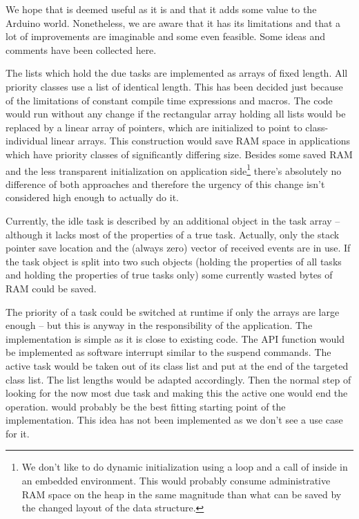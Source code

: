 We hope that \rtos{} is deemed useful as it is and that it adds some value
to the Arduino world. Nonetheless, we are aware that it has its limitations
and that a lot of improvements are imaginable and some even feasible. Some
ideas and comments have been collected here.

The lists which hold the due tasks are implemented as arrays of fixed
length. All priority classes use a list of identical length. This has been
decided just because of the limitations of constant compile time
expressions and macros. The code would run without any change if the
rectangular array holding all lists would be replaced by a linear array of
pointers, which are initialized to point to class-individual linear
arrays. This construction would save RAM space in applications which have
priority classes of significantly differing size. Besides some saved RAM
and the less transparent initialization on application side\footnote{We
don't like to do dynamic initialization using a loop and a call of
 inside in an embedded environment. This would probably
consume administrative RAM space on the heap in the same magnitude than
what can be saved by the changed layout of the \rtos{} data structure.}
there's absolutely no difference of both approaches and therefore the
urgency of this change isn't considered high enough to actually do it.

Currently, the idle task is described by an additional object in the task
array -- although it lacks most of the properties of a true task.
Actually, only the stack pointer save location and the (always zero)
vector of received events are in use. If the task object is split into two
such objects (holding the properties of all tasks and holding the
properties of true tasks only) some currently wasted bytes of RAM could be
saved.

The priority of a task could be switched at runtime if only the arrays are
large enough -- but this is anyway in the responsibility of the
application. The implementation is simple as it is close to existing code.
The API function would be implemented as software interrupt similar to the
suspend commands. The active task would be taken out of its class list and
put at the end of the targeted class list. The list lengths would be
adapted accordingly. Then the normal step of looking for the now most due
task and making this the active one would end the operation.
 would probably be the best fitting starting point
of the implementation. This idea has not been implemented as we don't see
a use case for it.

